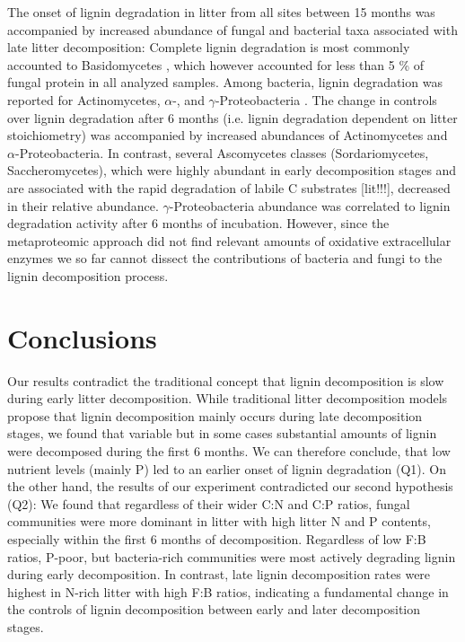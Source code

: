 The onset of lignin degradation in litter from all sites between 15 months was accompanied by increased abundance of fungal and bacterial taxa associated with late litter decomposition: Complete lignin degradation is most commonly accounted to Basidomycetes \cite{Berg2008}, which however accounted for less than 5 \% of fungal protein in all analyzed samples. Among bacteria, lignin degradation was reported for Actinomycetes, $\alpha$-, and $\gamma$-Proteobacteria \cite{Bugg2011}. The change in controls over lignin degradation  after 6 months (i.e. lignin degradation dependent on litter stoichiometry) was accompanied by increased abundances of Actinomycetes and $\alpha$-Proteobacteria. In contrast, several Ascomycetes classes (Sordariomycetes, Saccheromycetes), which were highly abundant in early decomposition stages and are associated with the rapid degradation of labile C substrates [lit!!!], decreased in their relative abundance. $\gamma$-Proteobacteria abundance was correlated to lignin degradation activity after 6 months of incubation. However, since the metaproteomic approach did not find relevant amounts of oxidative extracellular enzymes we so far cannot dissect the contributions of bacteria and fungi to the lignin decomposition process. 

\section*{Conclusions}
Our results contradict the traditional concept that lignin decomposition is slow during early litter decomposition. While traditional litter decomposition models propose that lignin decomposition mainly occurs during late decomposition stages, we found that variable but in some cases substantial amounts of lignin were decomposed during the first 6 months. We can therefore conclude, that low nutrient levels (mainly P) led to an earlier onset of lignin degradation (Q1). On the other hand, the results of our experiment contradicted our second hypothesis (Q2): We found that regardless of their wider C:N and C:P ratios, fungal communities were more dominant in litter with high litter N and P contents, especially within the first 6 months of decomposition. Regardless of low F:B ratios, P-poor, but bacteria-rich communities were most actively degrading lignin during early decomposition.  In contrast, late lignin decomposition rates were highest in N-rich litter with high F:B ratios, indicating a fundamental change in the controls of lignin decomposition between early and later decomposition stages.












